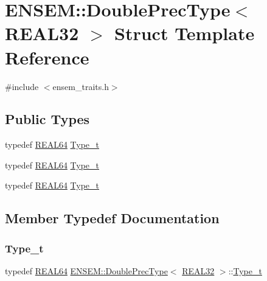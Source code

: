 \hypertarget{structENSEM_1_1DoublePrecType_3_01REAL32_01_4}{}\section{E\+N\+S\+EM\+:\+:Double\+Prec\+Type$<$ R\+E\+A\+L32 $>$ Struct Template Reference}
\label{structENSEM_1_1DoublePrecType_3_01REAL32_01_4}


{\ttfamily \#include $<$ensem\+\_\+traits.\+h$>$}

\subsection*{Public Types}
\begin{DoxyCompactItemize}
\item 
typedef \mbox{\hyperlink{namespaceENSEM_a85b215b9f1f43715aebee01718e25082}{R\+E\+A\+L64}} \mbox{\hyperlink{structENSEM_1_1DoublePrecType_3_01REAL32_01_4_ae855602a46f5a89750f4c0c7d39277e8}{Type\+\_\+t}}
\item 
typedef \mbox{\hyperlink{namespaceENSEM_a85b215b9f1f43715aebee01718e25082}{R\+E\+A\+L64}} \mbox{\hyperlink{structENSEM_1_1DoublePrecType_3_01REAL32_01_4_ae855602a46f5a89750f4c0c7d39277e8}{Type\+\_\+t}}
\item 
typedef \mbox{\hyperlink{namespaceENSEM_a85b215b9f1f43715aebee01718e25082}{R\+E\+A\+L64}} \mbox{\hyperlink{structENSEM_1_1DoublePrecType_3_01REAL32_01_4_ae855602a46f5a89750f4c0c7d39277e8}{Type\+\_\+t}}
\end{DoxyCompactItemize}


\subsection{Member Typedef Documentation}
\mbox{\label{structENSEM_1_1DoublePrecType_3_01REAL32_01_4_ae855602a46f5a89750f4c0c7d39277e8}} 
\subsubsection{\texorpdfstring{Type\_t}{Type\_t}\hspace{0.1cm}{\footnotesize\ttfamily [1/3]}}
{\footnotesize\ttfamily typedef \mbox{\hyperlink{namespaceENSEM_a85b215b9f1f43715aebee01718e25082}{R\+E\+A\+L64}} \mbox{\hyperlink{structENSEM_1_1DoublePrecType}{E\+N\+S\+E\+M\+::\+Double\+Prec\+Type}}$<$ \mbox{\hyperlink{namespaceENSEM_a7540d01191172323e9073283d772576d}{R\+E\+A\+L32}} $>$\+::\mbox{\hyperlink{structENSEM_1_1DoublePrecType_3_01REAL32_01_4_ae855602a46f5a89750f4c0c7d39277e8}{Type\+\_\+t}}}

